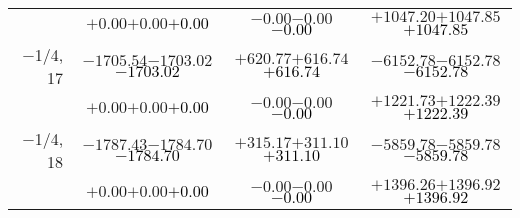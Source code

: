 \documentclass[compress]{beamer}
\begin{document}
\begin{frame}
{\begin{tabular}{r | c | c | c}
           & $+0.00$\hspace{0.1 cm}$+0.00$\hspace{0.1 cm}\textcolor{black}{$+0.00$} & $-0.00$\hspace{0.1 cm}$-0.00$\hspace{0.1 cm}\textcolor{black}{$-0.00$} & $+1047.20$\hspace{0.1 cm}$+1047.85$\hspace{0.1 cm}\textcolor{black}{$+1047.85$} \\
$-$1/4, 17 & $-1705.54$\hspace{0.1 cm}$-1703.02$\hspace{0.1 cm}\textcolor{black}{$-1703.02$} & $+620.77$\hspace{0.1 cm}$+616.74$\hspace{0.1 cm}\textcolor{black}{$+616.74$} & $-6152.78$\hspace{0.1 cm}$-6152.78$\hspace{0.1 cm}\textcolor{black}{$-6152.78$} \\
           & $+0.00$\hspace{0.1 cm}$+0.00$\hspace{0.1 cm}\textcolor{black}{$+0.00$} & $-0.00$\hspace{0.1 cm}$-0.00$\hspace{0.1 cm}\textcolor{black}{$-0.00$} & $+1221.73$\hspace{0.1 cm}$+1222.39$\hspace{0.1 cm}\textcolor{black}{$+1222.39$} \\
$-$1/4, 18 & $-1787.43$\hspace{0.1 cm}$-1784.70$\hspace{0.1 cm}\textcolor{black}{$-1784.70$} & $+315.17$\hspace{0.1 cm}$+311.10$\hspace{0.1 cm}\textcolor{black}{$+311.10$} & $-5859.78$\hspace{0.1 cm}$-5859.78$\hspace{0.1 cm}\textcolor{black}{$-5859.78$} \\
           & $+0.00$\hspace{0.1 cm}$+0.00$\hspace{0.1 cm}\textcolor{black}{$+0.00$} & $-0.00$\hspace{0.1 cm}$-0.00$\hspace{0.1 cm}\textcolor{black}{$-0.00$} & $+1396.26$\hspace{0.1 cm}$+1396.92$\hspace{0.1 cm}\textcolor{black}{$+1396.92$} \\
\end{tabular}}
\end{frame}
\end{document}
